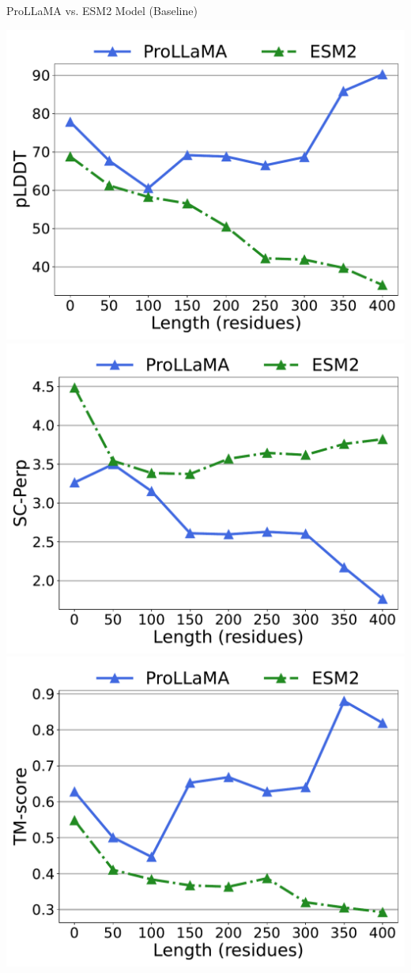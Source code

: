 \documentclass[dvipsnames]{beamer}
\begin{document}
\begin{frame}{ProLLaMA vs. ESM2 Model (Baseline)}
	\begin{center}
		\includegraphics[scale=0.23]{images/combined_length_plddt_zhexiantu.pdf}
		\includegraphics[scale=0.23]{images/combined_length_scperp_zhexiantu.pdf}
		\includegraphics[scale=0.23]{images/combined_length_alntmscore_zhexiantu.pdf}

\end{center}
\end{frame}
\end{document}
